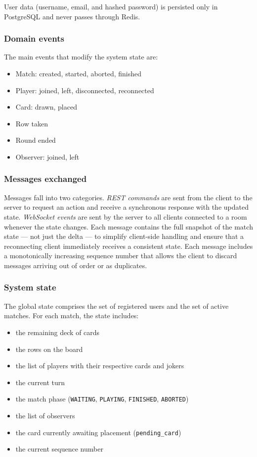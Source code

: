 \documentclass{scrartcl}
\begin{document}
User data (username, email, and hashed password) is persisted only in PostgreSQL
and never passes through Redis.

\subsubsection*{Domain events}

The main events that modify the system state are:

\begin{itemize}
  \item Match: created, started, aborted, finished
  \item Player: joined, left, disconnected, reconnected
  \item Card: drawn, placed
  \item Row taken
  \item Round ended
  \item Observer: joined, left
\end{itemize}

\subsubsection*{Messages exchanged}

Messages fall into two categories.
\emph{REST commands} are sent from the client to the server to request an action
and receive a synchronous response with the updated state.
\emph{WebSocket events} are sent by the server to all clients connected to a room
whenever the state changes.
Each message contains the full snapshot of the match state --- not just the delta ---
to simplify client-side handling and ensure that a reconnecting client
immediately receives a consistent state.
Each message includes a monotonically increasing sequence number
that allows the client to discard messages arriving out of order or as duplicates.

\subsubsection*{System state}

The global state comprises the set of registered users and the set of active matches.
For each match, the state includes:

\begin{itemize}
  \item the remaining deck of cards
  \item the rows on the board
  \item the list of players with their respective cards and jokers
  \item the current turn
  \item the match phase (\texttt{WAITING}, \texttt{PLAYING}, \texttt{FINISHED}, \texttt{ABORTED})
  \item the list of observers
  \item the card currently awaiting placement (\texttt{pending\_card})
  \item the current sequence number
\end{itemize}
\end{document}

